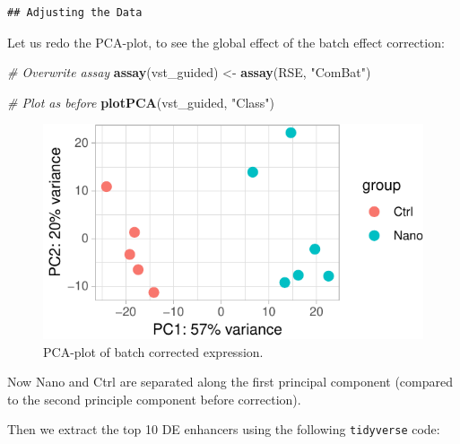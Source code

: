 \documentclass[9pt,a4paper,]{extarticle}
\newenvironment{Shaded}{\begin{snugshade}}{\end{snugshade}}
\newcommand{\KeywordTok}[1]{\textcolor[rgb]{0.13,0.29,0.53}{\textbf{{#1}}}}
\newcommand{\StringTok}[1]{\textcolor[rgb]{0.31,0.60,0.02}{{#1}}}
\newcommand{\CommentTok}[1]{\textcolor[rgb]{0.56,0.35,0.01}{\textit{{#1}}}}
\newcommand{\NormalTok}[1]{{#1}}
\begin{document}
\begin{verbatim}
## Adjusting the Data
\end{verbatim}

Let us redo the PCA-plot, to see the global effect of the batch effect correction:

\begin{Shaded}
\begin{Highlighting}[]
\CommentTok{# Overwrite assay }
\KeywordTok{assay}\NormalTok{(vst_guided) <-}\StringTok{ }\KeywordTok{assay}\NormalTok{(RSE, }\StringTok{"ComBat"}\NormalTok{)}

\CommentTok{# Plot as before}
\KeywordTok{plotPCA}\NormalTok{(vst_guided, }\StringTok{"Class"}\NormalTok{)}
\end{Highlighting}
\end{Shaded}

\begin{figure}

{\centering \includegraphics{CAGEWorkflow_files/figure-latex/correctedPCA-1} 

}

\caption{PCA-plot of batch corrected expression.}\label{fig:correctedPCA}
\end{figure}

Now Nano and Ctrl are separated along the first principal component (compared to the second principle component before correction).

Then we extract the top 10 DE enhancers using the following \texttt{tidyverse} code:
\end{document}
